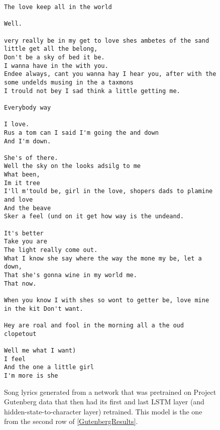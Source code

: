 \documentclass[10pt,twocolumn,letterpaper]{article}
\begin{document}
		\begin{figure}
			\begin{lstlisting}
The love keep all in the world

Well.

very really be in my get to love shes ambetes of the sand little get all the belong,
Don't be a sky of bed it be.
I wanna have in the with you.
Endee always, cant you wanna hay I hear you, after with the some undelds musing in the a taxmons
I trould not bey I sad think a little getting me.

Everybody way

I love.
Rus a tom can I said I'm going the and down
And I'm down.

She's of there.
Well the sky on the looks adsilg to me
What been,
Im it tree
I'll m'tould be, girl in the love, shopers dads to plamine and love
And the beave
Sker a feel (und on it get how way is the undeand.

It's better
Take you are
The light really come out.
What I know she say where the way the mone my be, let a down,
That she's gonna wine in my world me.
That now.

When you know I with shes so wont to getter be, love mine in the kit Don't want.

Hey are roal and fool in the morning all a the oud clopetout

Well me what I want)
I feel
And the one a little girl
I'm more is she 
			\end{lstlisting}
			\caption{Song lyrics generated from a network that was pretrained on Project Gutenberg data that then had its first and last LSTM layer (and hidden-state-to-character layer) retrained. This model is the one from the second row of \tablename{\ref{GutenbergResults}}.}
			\label{gutenberg_sample}
		\end{figure}
		
\end{document}
